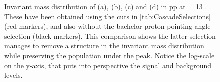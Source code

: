 \begin{figure}[t]
\hspace*{-1.5cm}
\hspace*{-1.5cm}	
	\caption{Invariant mass distribution of \rmXiM (a), \rmAxiP (b), \rmOmegaM (c) and \rmAomegaP (d) in pp at \sqrtS = 13 \tev. These have been obtained using the cuts in \tab\ref{tab:CascadeSelections} (red markers), and also without the bachelor-proton pointing angle selection (black markers). This comparison shows the latter selection manages to remove a structure in the invariant mass distribution while preserving the population under the peak. Notice the log-scale on the y-axis, that puts into perspective the signal and background levels.}
	\label{fig:WrongPA}
\end{figure}

